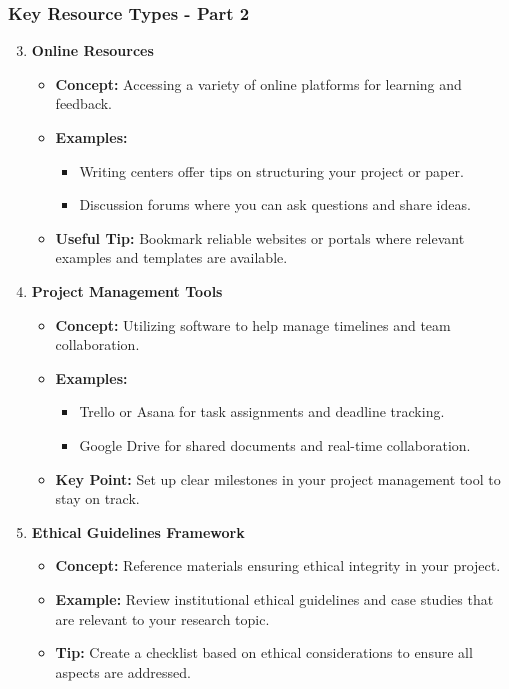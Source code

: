 \documentclass{beamer}
\begin{document}
\begin{frame}[fragile]
    \frametitle{Key Resource Types - Part 2}
    \begin{enumerate}
        \setcounter{enumi}{2} %
        \item \textbf{Online Resources}
            \begin{itemize}
                \item \textbf{Concept:} Accessing a variety of online platforms for learning and feedback.
                \item \textbf{Examples:}
                    \begin{itemize}
                        \item Writing centers offer tips on structuring your project or paper.
                        \item Discussion forums where you can ask questions and share ideas.
                    \end{itemize}
                \item \textbf{Useful Tip:} Bookmark reliable websites or portals where relevant examples and templates are available.
            \end{itemize}
        
        \item \textbf{Project Management Tools}
            \begin{itemize}
                \item \textbf{Concept:} Utilizing software to help manage timelines and team collaboration.
                \item \textbf{Examples:}
                    \begin{itemize}
                        \item Trello or Asana for task assignments and deadline tracking.
                        \item Google Drive for shared documents and real-time collaboration.
                    \end{itemize}
                \item \textbf{Key Point:} Set up clear milestones in your project management tool to stay on track.
            \end{itemize}
        
        \item \textbf{Ethical Guidelines Framework}
            \begin{itemize}
                \item \textbf{Concept:} Reference materials ensuring ethical integrity in your project.
                \item \textbf{Example:} Review institutional ethical guidelines and case studies that are relevant to your research topic.
                \item \textbf{Tip:} Create a checklist based on ethical considerations to ensure all aspects are addressed.
            \end{itemize}
    \end{enumerate}
\end{frame}
\end{document}
